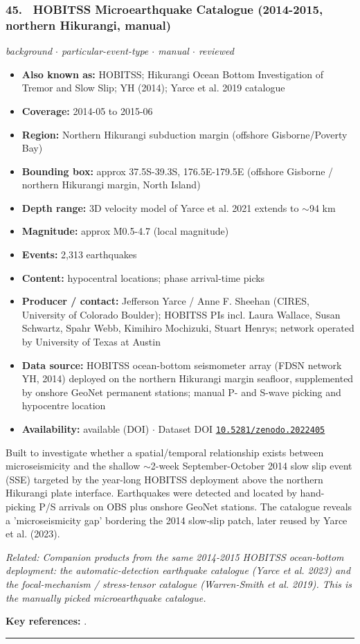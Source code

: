 \documentclass[10pt,a4paper]{article}
\newcommand{\catentryrule}{\par\vspace{3pt}\noindent\textcolor{rulegrey}{\rule{\linewidth}{0.3pt}}\par\vspace{5pt}}
\newcommand{\kv}[2]{\item \textbf{#1:} #2}
\begin{document}
\subsubsection*{\hypertarget{c:45}{45.}~ HOBITSS Microearthquake Catalogue (2014-2015, northern Hikurangi, manual)}
{\small\itshape background $\cdot$ particular-event-type $\cdot$ manual $\cdot$ reviewed}\par\vspace{2pt}
\begin{itemize}[leftmargin=1.3em,itemsep=0.6pt,topsep=1pt,parsep=0pt]
\kv{Also known as}{HOBITSS; Hikurangi Ocean Bottom Investigation of Tremor and Slow Slip; YH (2014); Yarce et al. 2019 catalogue}
\kv{Coverage}{2014-05 to 2015-06}
\kv{Region}{Northern Hikurangi subduction margin (offshore Gisborne/Poverty Bay)}
\kv{Bounding box}{approx 37.5S-39.3S, 176.5E-179.5E (offshore Gisborne / northern Hikurangi margin, North Island)}
\kv{Depth range}{3D velocity model of Yarce et al. 2021 extends to $\sim$94 km}
\kv{Magnitude}{approx M0.5-4.7 (local magnitude)}
\kv{Events}{2,313 earthquakes}
\kv{Content}{hypocentral locations; phase arrival-time picks}
\kv{Producer / contact}{Jefferson Yarce / Anne F. Sheehan (CIRES, University of Colorado Boulder); HOBITSS PIs incl. Laura Wallace, Susan Schwartz, Spahr Webb, Kimihiro Mochizuki, Stuart Henrys; network operated by University of Texas at Austin}
\kv{Data source}{HOBITSS ocean-bottom seismometer array (FDSN network YH, 2014) deployed on the northern Hikurangi margin seafloor, supplemented by onshore GeoNet permanent stations; manual P- and S-wave picking and hypocentre location}
\kv{Availability}{available (DOI) $\cdot$ Dataset DOI \href{https://doi.org/10.5281/zenodo.2022405}{\nolinkurl{10.5281/zenodo.2022405}}}
\end{itemize}
\par\vspace{2pt}Built to investigate whether a spatial/temporal relationship exists between microseismicity and the shallow $\sim$2-week September-October 2014 slow slip event (SSE) targeted by the year-long HOBITSS deployment above the northern Hikurangi plate interface. Earthquakes were detected and located by hand-picking P/S arrivals on OBS plus onshore GeoNet stations. The catalogue reveals a 'microseismicity gap' bordering the 2014 slow-slip patch, later reused by Yarce et al. (2023).
\par{\small\itshape Related: Companion products from the same 2014-2015 HOBITSS ocean-bottom deployment: the automatic-detection earthquake catalogue (Yarce et al. 2023) and the focal-mechanism / stress-tensor catalogue (Warren-Smith et al. 2019). This is the manually picked microearthquake catalogue.}
\par\vspace{2pt}\textbf{Key references:} \cite{Yarce2019,Yarce2018,UniversityofTexasatAustin2014}.
\catentryrule
\end{document}
